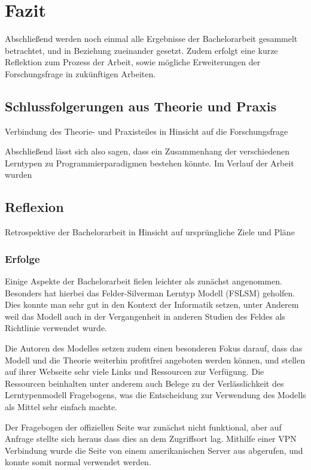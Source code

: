 \clearpage
\section{Fazit}
\label{sec:conclusion}

Abschließend werden noch einmal alle Ergebnisse der Bachelorarbeit gesammelt betrachtet, und in Beziehung zueinander gesetzt. Zudem erfolgt eine kurze Reflektion zum Prozess der Arbeit, sowie mögliche Erweiterungen der Forschungsfrage in zukünftigen Arbeiten.

\subsection{Schlussfolgerungen aus Theorie und Praxis}
Verbindung des Theorie- und Praxisteiles in Hinsicht auf die Forschungsfrage

Abschließend lässt sich also sagen, dass ein Zusammenhang der verschiedenen Lerntypen zu Programmierparadigmen bestehen könnte. Im Verlauf der Arbeit wurden 

\subsection{Reflexion}
Retrospektive der Bachelorarbeit in Hinsicht auf ursprüngliche Ziele und Pläne

\subsubsection{Erfolge}
Einige Aspekte der Bachelorarbeit fielen leichter als zunächst angenommen. Besonders hat hierbei das Felder-Silverman Lerntyp Modell (FSLSM) geholfen. Dies konnte man sehr gut in den Kontext der Informatik setzen, unter Anderem weil das Modell auch in der Vergangenheit in anderen Studien des Feldes als Richtlinie verwendet wurde.

Die Autoren des Modelles setzen zudem einen besonderen Fokus darauf, dass das Modell und die Theorie weiterhin profitfrei angeboten werden können, und stellen auf ihrer Webseite sehr viele Links und Ressourcen zur Verfügung. Die Ressourcen beinhalten unter anderem auch Belege zu der Verlässlichkeit des Lerntypenmodell Fragebogens, was die Entscheidung zur Verwendung des Modells als Mittel sehr einfach machte.

Der Fragebogen der offiziellen Seite war zunächst nicht funktional, aber auf Anfrage stellte sich heraus dass dies an dem Zugriffsort lag. Mithilfe einer VPN Verbindung wurde die Seite von einem amerikanischen Server aus abgerufen, und konnte somit normal verwendet werden. %

